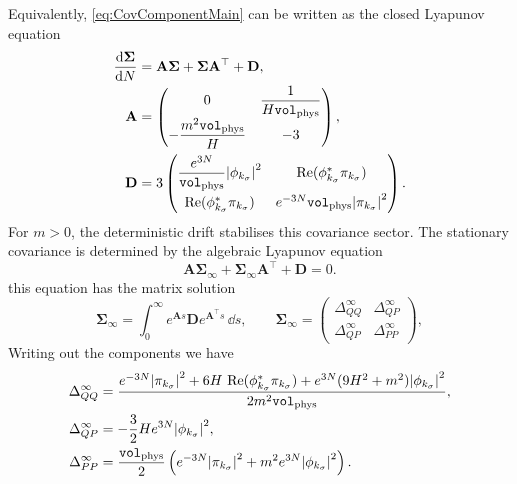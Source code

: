 \documentclass{article}
\newcommand{\Vphys}{\mathtt{vol}_{\rm phys}}
\numberwithin{equation}{section}
\begin{document}
	Equivalently, \cref{eq:CovComponentMain} can be written as the closed Lyapunov equation
	\begin{align}
		\dv{\mathbf{\Sigma}}{N}
		&=\mathbf{A}\mathbf{\Sigma}+\mathbf{\Sigma} \mathbf{A}^\top+\mathbf{D},
		\label{eq:CovLyapunovMain}
		\\
		\mathbf{A}&=
		\begin{pmatrix}
			0 & \dfrac{1}{H\Vphys}\\[6pt]
			-\dfrac{m^2\Vphys}{H} & -3
		\end{pmatrix},
		\nonumber\\
		\mathbf{D}&=3
		\begin{pmatrix}
			\dfrac{e^{3N}}{\Vphys}\abs{\phi_{k_\sigma}}^2
			& \Re(\phi_{k_\sigma}^*\pi_{k_\sigma}) \\[8pt]
			\Re(\phi_{k_\sigma}^*\pi_{k_\sigma})
			& e^{-3N}\Vphys\abs{\pi_{k_\sigma}}^2
		\end{pmatrix}.
		\nonumber
	\end{align}
	For \(m>0\), the deterministic drift stabilises this covariance sector. The stationary covariance is determined by the algebraic Lyapunov equation
    \begin{equation}
    	\mathbf A\boldsymbol{\Sigma}_\infty
    	+
    	\boldsymbol{\Sigma}_\infty\mathbf A^\top
    	+
    	\mathbf D
    	=0.
    	\label{eq:StationaryLyapunovMain}
    \end{equation}
    this equation has the matrix solution
    \begin{equation}
    	\boldsymbol{\Sigma}_\infty
    	=
    	\int_0^\infty
    	e^{\mathbf A s}\mathbf D e^{\mathbf A^\top s}\,\dd s, \qquad 		\mathbf{\Sigma}_\infty=
		\begin{pmatrix}
			\Delta_{QQ}^{\infty} & \Delta_{QP}^{\infty}\\
			\Delta_{QP}^{\infty} & \Delta_{PP}^{\infty}
		\end{pmatrix},
    	\label{eq:StationaryCovMatrixMain}
    \end{equation}
    Writing out the components we have
	\begin{align}
		\Delta_{QQ}^{\infty}
		&=
		\frac{
			e^{-3N}\abs{\pi_{k_\sigma}}^2
			+6H\,\Re(\phi_{k_\sigma}^*\pi_{k_\sigma})
			+e^{3N}(9H^2+m^2)\abs{\phi_{k_\sigma}}^2
		}{2m^2\Vphys},\\
		\Delta_{QP}^{\infty}
		&=
		-\frac32 H e^{3N}\abs{\phi_{k_\sigma}}^2,\\
		\Delta_{PP}^{\infty}
		&=
		\frac{\Vphys}{2}
		\left(
			e^{-3N}\abs{\pi_{k_\sigma}}^2
			+m^2e^{3N}\abs{\phi_{k_\sigma}}^2
		\right).
	\end{align}
\end{document}
